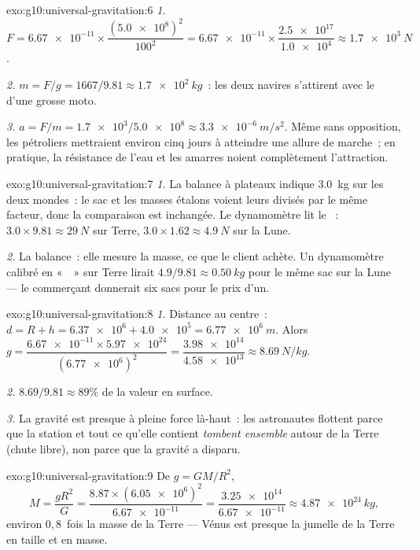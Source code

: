 \begin{solution}{exo:g10:universal-gravitation:6}
\emph{1.} $F = \num{6.67e-11} \times
\dfrac{(\num{5.0e8})^2}{100^2}
= \num{6.67e-11} \times \dfrac{\num{2.5e17}}{\num{1.0e4}}
\approx \qty{1.7e3}{N}$.

\emph{2.} $m = F/g = 1667/9.81 \approx \qty{1.7e2}{kg}$~: les deux
navires s'attirent avec le  d'une grosse moto.

\emph{3.} $a = F/m = \num{1.7e3}/\num{5.0e8} \approx
\qty{3.3e-6}{m/s^2}$. Même sans opposition, les pétroliers mettraient
environ cinq jours à atteindre une allure de marche~; en pratique, la
résistance de l'eau et les amarres noient complètement l'attraction.
\end{solution}

\begin{solution}{exo:g10:universal-gravitation:7}
\emph{1.} La balance à plateaux indique \qty{3.0}{kg} sur les deux
mondes~: le sac et les masses étalons voient leurs
 divisés par le même facteur, donc la comparaison est
inchangée. Le dynamomètre lit le ~:
$3.0 \times 9.81 \approx \qty{29}{N}$ sur Terre,
$3.0 \times 1.62 \approx \qty{4.9}{N}$ sur la Lune.

\emph{2.} La balance~: elle mesure la masse, ce que le client achète.
Un dynamomètre calibré en «~~» sur Terre lirait
$4.9/9.81 \approx \qty{0.50}{kg}$ pour le même sac sur la Lune --- le
commerçant donnerait six sacs pour le prix d'un.
\end{solution}

\begin{solution}{exo:g10:universal-gravitation:8}
\emph{1.} Distance au centre~:
$d = R + h = \num{6.37e6} + \num{4.0e5} = \qty{6.77e6}{m}$. Alors
$g = \dfrac{\num{6.67e-11} \times \num{5.97e24}}{(\num{6.77e6})^2}
= \dfrac{\num{3.98e14}}{\num{4.58e13}} \approx \qty{8.69}{N/kg}$.

\emph{2.} $8.69/9.81 \approx 89\%$ de la valeur en surface.

\emph{3.} La gravité est presque à pleine force là-haut~: les
astronautes flottent parce que la station et tout ce qu'elle contient
\emph{tombent ensemble} autour de la Terre (chute libre), non parce
que la gravité a disparu.
\end{solution}

\begin{solution}{exo:g10:universal-gravitation:9}
De $g = GM/R^2$,
\[
M = \frac{g R^2}{G}
= \frac{8.87 \times (\num{6.05e6})^2}{\num{6.67e-11}}
= \frac{\num{3.25e14}}{\num{6.67e-11}}
\approx \qty{4.87e24}{kg},
\]
environ $0{,}8$~fois la masse de la Terre --- Vénus est presque la
jumelle de la Terre en taille et en masse.
\end{solution}

